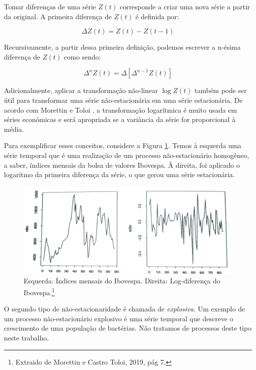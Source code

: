 Tomar diferenças de uma série $Z(t)$ corresponde a criar uma nova série a partir da original. A primeira diferença de $Z(t)$ é definida por:

\begin{equation}\label{series:2.12}
\Delta Z(t) = Z(t) - Z(t - 1)
\end{equation}

Recursivamente, a partir dessa primeira definição, podemos escrever a n-ésima diferença de $Z(t)$ como sendo:

\begin{equation}\label{series:2.13}
\Delta^n Z(t) = \Delta[\Delta^{n-1} Z(t)]
\end{equation}

Adicionalmente, aplicar a transformação não-linear $\log Z(t)$ também pode ser útil para transformar uma série não-estacionária em uma série estacionária. De acordo com Morettin e Toloi \citep{morettin}, a transformação logarítmica é muito usada em séries econômicas e será apropriada se a variância da série for proporcional à média.

Para exemplificar esses conceitos, considere a Figura \ref{fig:exe_estac}. Temos à esquerda uma série temporal que é uma realização de um processo não-estacionário homogêneo, a saber, índices mensais da bolsa de valores Ibovespa. À direita, foi aplicado o logaritmo da primeira diferença da série, o que gerou uma série estacionária.

\begin{figure}[htb]
\centering
\includegraphics[width=14cm]{figuras/exemplo_estac}
\caption{Esquerda: Índices mensais do Ibovespa. Direita: Log-diferença do Ibovespa.\footnote{Extraido de Morettin e Castro Toloi, 2019, pág 7.}}
\label{fig:exe_estac}
\end{figure}

O segundo tipo de não-estacionaridade é chamada de \emph{explosiva}. Um exemplo de um processo não-estacionário explosivo é uma série temporal que descreve o crescimento de uma população de bactérias. Não tratamos de processos deste tipo neste trabalho.

